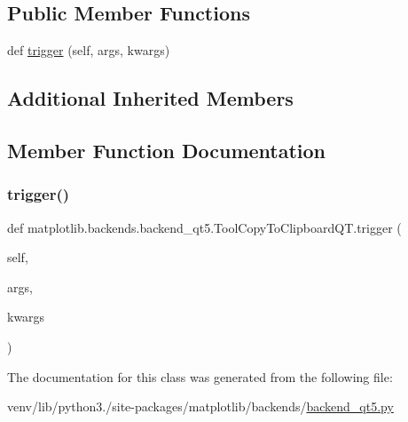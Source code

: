 \subsection*{Public Member Functions}
\begin{DoxyCompactItemize}
\item 
def \hyperlink{classmatplotlib_1_1backends_1_1backend__qt5_1_1ToolCopyToClipboardQT_a1aa066f149edfceb0fe7b4e0f9f2dec8}{trigger} (self, args, kwargs)
\end{DoxyCompactItemize}
\subsection*{Additional Inherited Members}


\subsection{Member Function Documentation}
\mbox{\label{classmatplotlib_1_1backends_1_1backend__qt5_1_1ToolCopyToClipboardQT_a1aa066f149edfceb0fe7b4e0f9f2dec8}} 
\subsubsection{\texorpdfstring{trigger()}{trigger()}}
{\footnotesize\ttfamily def matplotlib.\+backends.\+backend\+\_\+qt5.\+Tool\+Copy\+To\+Clipboard\+Q\+T.\+trigger (\begin{DoxyParamCaption}\item[{}]{self,  }\item[{}]{args,  }\item[{}]{kwargs }\end{DoxyParamCaption})}



The documentation for this class was generated from the following file\+:\begin{DoxyCompactItemize}
\item 
venv/lib/python3./site-\/packages/matplotlib/backends/\hyperlink{backend__qt5_8py}{backend\+\_\+qt5.\+py}\end{DoxyCompactItemize}
